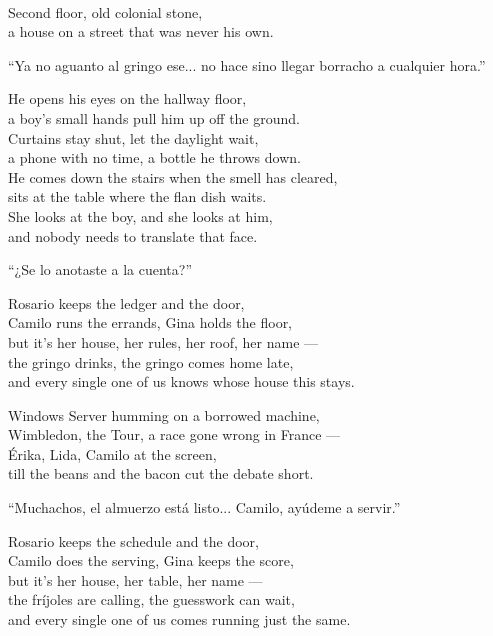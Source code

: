 \begin{lyrics}
\\
Second floor, old colonial stone,\\
a house on a street that was never his own.

``Ya no aguanto al gringo ese... no hace sino llegar borracho a cualquier hora.''

He opens his eyes on the hallway floor,\\
a boy's small hands pull him up off the ground.\\
Curtains stay shut, let the daylight wait,\\
a phone with no time, a bottle he throws down.\\
He comes down the stairs when the smell has cleared,\\
sits at the table where the flan dish waits.\\
She looks at the boy, and she looks at him,\\
and nobody needs to translate that face.

``¿Se lo anotaste a la cuenta?''

Rosario keeps the ledger and the door,\\
Camilo runs the errands, Gina holds the floor,\\
but it's her house, her rules, her roof, her name —\\
the gringo drinks, the gringo comes home late,\\
and every single one of us knows whose house this stays.

Windows Server humming on a borrowed machine,\\
Wimbledon, the Tour, a race gone wrong in France —\\
Érika, Lida, Camilo at the screen,\\
till the beans and the bacon cut the debate short.

``Muchachos, el almuerzo está listo... Camilo, ayúdeme a servir.''

Rosario keeps the schedule and the door,\\
Camilo does the serving, Gina keeps the score,\\
but it's her house, her table, her name —\\
the fríjoles are calling, the guesswork can wait,\\
and every single one of us comes running just the same.


\end{lyrics}
